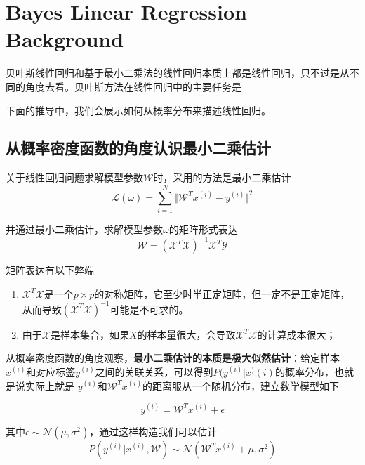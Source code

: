 \chapter{Bayes Linear Regression Background}

贝叶斯线性回归和基于最小二乘法的线性回归本质上都是线性回归，只不过是从不同的角度去看。贝叶斯方法在线性回归中的主要任务是

下面的推导中，我们会展示如何从概率分布来描述线性回归。

\section{从概率密度函数的角度认识最小二乘估计}

关于线性回归问题求解模型参数$\mathcal{W}$时，采用的方法是最小二乘估计
\begin{equation}
    \mathcal{L}(\omega)=\sum_{i=1}^{N}\Vert \mathcal{W}^T x^{(i)}-y^{(i)}\Vert^2
\end{equation}

并通过最小二乘估计，求解模型参数$\omega$的矩阵形式表达
\begin{equation}
    \mathcal{W}=(\mathcal{X}^T\mathcal{X})^{-1}\mathcal{X}^T\mathcal{Y}
\end{equation}

矩阵表达有以下弊端

\begin{enumerate}[itemindent=2em]
    \item $\mathcal{X}^T\mathcal{X}$是一个$p\times p$的对称矩阵，它至少时半正定矩阵，但一定不是正定矩阵，从而导致$(\mathcal{X}^T\mathcal{X})^{-1}$可能是不可求的。
    \item 由于$\mathcal{X}$是样本集合，如果$X$的样本量很大，会导致$\mathcal{X}^T\mathcal{X}$的计算成本很大；
\end{enumerate}

从概率密度函数的角度观察，\textbf{最小二乘估计的本质是极大似然估计}：给定样本$x^{(i)}$和对应标签$y^{(i)}$之间的关联关系，可以得到$P(y^{(i)}|x^){(i)}$的概率分布，也就是说实际上就是
$y^{(i)}$和$\mathcal{W}^Tx^{(i)}$的距离服从一个随机分布，建立数学模型如下
\begin{mdframed}
    \begin{equation}
        y^{(i)}=\mathcal{W}^Tx^{(i)}+\epsilon
    \end{equation}
\end{mdframed}

其中$\epsilon\sim \mathcal{N}(\mu,\sigma^2)$，通过这样构造我们可以估计
\begin{equation}
    P(y^{(i)}|x^{(i)},\mathcal{W})\sim \mathcal{N}(\mathcal{W}^Tx^{(i)}+\mu,\sigma^2)
\end{equation}

